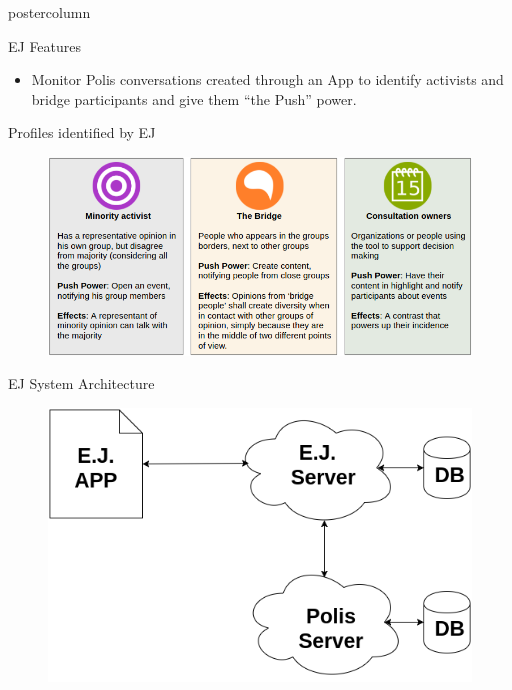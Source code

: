 \documentclass[final,hyperref={pdfpagelabels=false}]{beamer}
\begin{document}
\begin{frame}
\begin{columns}
\begin{column}{.49\textwidth}
\begin{beamercolorbox}[center,wd=\textwidth]{postercolumn}
\begin{minipage}[T]{.95\textwidth}
{\begin{block}{EJ Features}
\begin{itemize}
    \item Monitor Polis conversations created through an App
    to identify activists and bridge participants and give them ``the Push''
    power.
  \end{itemize}

\end{block}

\begin{block}{Profiles identified by EJ}
  \begin{figure}
    \begin{center}
      \includegraphics[scale=1.45]{../images/userprofiles.png}
      \caption{}
      \label{fig:user-profiles}
    \end{center}
  \end{figure}
\end{block}

\begin{block}{EJ System Architecture}

  \begin{figure}
    \begin{center}
      \includegraphics[scale=1.3]{../images/polis4.png}
      \label{fig:architecture}
    \end{center}
  \end{figure}


\end{block}}
\end{minipage}
\end{beamercolorbox}
\end{column}
\end{columns}
\end{frame}
\end{document}
